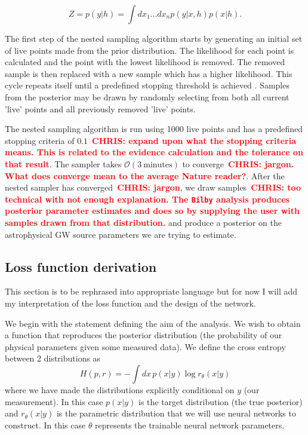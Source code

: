 \documentclass[%
showpacs,
 amsmath,amssymb,
 aps,
 twocolumn,
 prl,
 reprint,
floatfix,
]{revtex4-1}
\newcommand{\chris}[1]{\textbf{\textcolor{red}{CHRIS: #1}}}
\begin{document}
\begin{equation}
    Z = p(y|h) = \int dx_1 ... dx_n p(y|x,h)p(x|h).\label{eq:evidence}
\end{equation}

%
%
The first step of the nested sampling algorithm starts by generating an initial
set of live points made from the prior distribution. The likelihood for each
point is calculated and the point with the lowest likelihood is removed. The
removed sample is then replaced with a new sample which has a higher
likelihood. This cycle repeats itself until a predefined stopping threshold is
achieved \cite{1409.7215} . Samples from the posterior may be drawn by randomly
selecting from both all current 'live' points and all previously removed 'live'
points.

The nested sampling algorithm is run using
1000 live points and has a predefined stopping criteria of $0.1$~\chris{expand
upon what the stopping criteria means. This is related to the evidence
calculation and the tolerance on that result}. The sampler takes $\mathcal{O}(3
\: \textrm{minutes})$ to converge~\chris{jargon. What does converge mean to the
average Nature reader?}. After the nested sampler has converged~\chris{jargon}, we draw
samples~\chris{too technical with not enough explanation. The \texttt{Bilby} analysis
produces posterior parameter estimates and does so by supplying the user with
samples drawn from that distribution.} and produce a posterior on the
astrophysical \ac{GW} source parameters we are trying to estimate.

\subsection{Loss function derivation} \label{lossDer_sec}

This section is to be rephrased into appropriate language but for now I will
add my interpretation of the loss function and the design of the network.

We begin with the statement defining the aim of the analysis. We wish to obtain
a function that reproduces the posterior distribution (the probability of our
physical parameters given some measured data). We define the cross entropy
between 2 distributions as
%
\begin{equation}\label{eq:cross_ent}
H(p,r) = -\int dx\, p(x|y) \log r_{\theta}(x|y)
\end{equation}
%
where we have made the distributions explicitly conditional on $y$ (our
measurement). In this case $p(x|y)$ is the target distribution (the true
posterior) and $r_{\theta}(x|y)$ is the parametric distribution that we will
use neural networks to construct. In this case $\theta$ represents the
trainable neural network parameters. 
\end{document}
